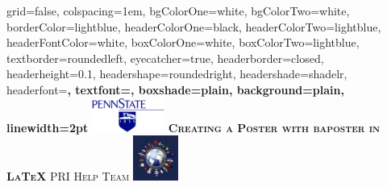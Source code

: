 \documentclass[a0paper,landscape]{baposter}
\begin{document}
\begin{poster}{
  grid=false,
  colspacing=1em,
  bgColorOne=white,
  bgColorTwo=white,
  borderColor=lightblue,
  headerColorOne=black,
  headerColorTwo=lightblue,
  headerFontColor=white,
  boxColorOne=white,
  boxColorTwo=lightblue,
  textborder=roundedleft,
  eyecatcher=true,
  headerborder=closed,
  headerheight=0.1\textheight,
  headershape=roundedright,
  headershade=shadelr,
  headerfont=\Large\bf\textsc, %
  textfont={\setlength{\parindent}{1.5em}},
  boxshade=plain,
  background=plain,
  linewidth=2pt
}
  {\includegraphics[height=3em]{images/psulogo.png}} 
  {\bf\textsc{Creating a Poster with baposter in \LaTeX{} }\vspace{0.5em}}
  {\textsc{PRI Help Team}}
  {%
    \includegraphics[height=4.0em]{images/pri-world.jpeg}
  }


\end{poster}
\end{document}
